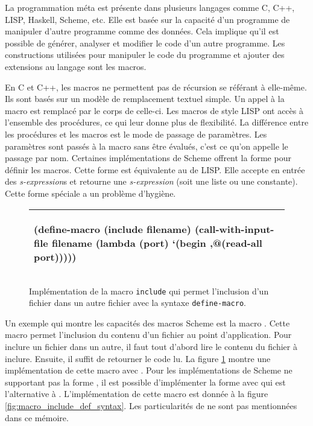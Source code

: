 La programmation méta est présente dans plusieurs langages comme C, C++, LISP,
Haskell, Scheme, etc. Elle est basée sur la capacité d'un programme de manipuler
d'autre programme comme des données. Cela implique qu'il est possible de
générer, analyser et modifier le code d'un autre programme.  Les
constructions utilisées pour manipuler le code du programme et
ajouter des extensions au langage sont les macros.

En C et C++, les macros ne permettent pas de récursion se référant à elle-même.
Ils sont basés sur un modèle de remplacement textuel simple. Un appel à la
macro est remplacé par le corps de celle-ci. Les macros de style LISP ont
accès à l'ensemble des procédures, ce qui leur donne plus de flexibilité.  La
différence entre les procédures et les macros est le mode de passage de
paramètres.  Les paramètres sont passés à la macro sans être évalués, c'est ce
qu'on appelle le passage par nom.  Certaines implémentations de Scheme offrent la forme
 pour définir les macros.  Cette forme est équivalente au
 de LISP. Elle accepte en entrée des \textit{s-expression}s et
retourne une \textit{s-expression} (soit une liste ou une constante).  Cette
forme spéciale a un problème d'hygiène.

\begin{figure}[htbp]
  \begin{tabular}{|l|}\hline
\begin{mplisting}{0.7}
(define-macro (include filename)
  (call-with-input-file
    filename
    (lambda (port)
      `(begin
        ,@(read-all port)))))
\end{mplisting}\\\hline
\end{tabular}

  \caption{Implémentation de la macro \texttt{include} qui permet l'inclusion
  d'un fichier dans un autre fichier avec la syntaxe \texttt{define-macro}.}

  \label{fig:macro_include}
\end{figure}

Un exemple qui montre les capacités des macros Scheme est la macro
.  Cette macro permet l'inclusion du contenu d'un fichier au
point d'application.  Pour inclure un fichier dans un autre, il faut tout
d'abord lire le contenu du fichier à inclure. Ensuite, il suffit de retourner le
code lu. La figure \ref{fig:macro_include} montre une implémentation de cette
macro avec .  Pour les implémentations de Scheme ne
supportant pas la forme , il est possible d'implémenter
la forme  avec  qui est l'alternative à
. L'implémentation de cette macro est donnée à la figure
\ref{fig:macro_include_def_syntax}. Les particularités de
 ne sont pas mentionnées dans ce mémoire.

